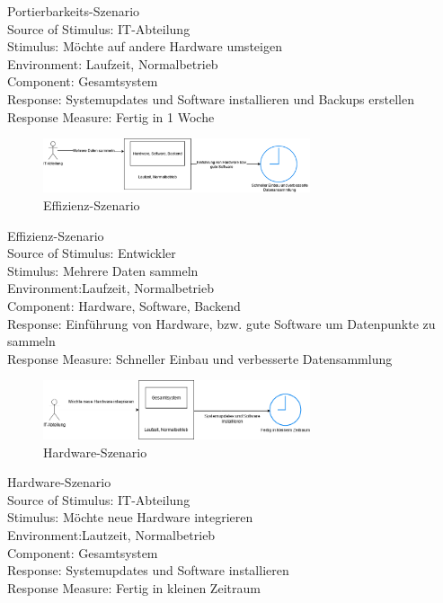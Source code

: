 Portierbarkeits-Szenario\\
Source of Stimulus: IT-Abteilung\\
Stimulus: Möchte auf andere Hardware umsteigen\\
Environment: Laufzeit, Normalbetrieb\\
Component: Gesamtsystem\\
Response: Systemupdates und Software installieren und Backups erstellen \\
Response Measure: Fertig in 1 Woche\\




\begin{figure}[tbh]
  \centering
  \includegraphics[width=0.7\textwidth]{Graphics/Effizienz.png}
  \caption{Effizienz-Szenario}
  \label{fig:Qualitaet5}
\end{figure}



Effizienz-Szenario\\
Source of Stimulus: Entwickler\\
Stimulus: Mehrere Daten sammeln\\
Environment:Laufzeit, Normalbetrieb\\
Component: Hardware, Software, Backend\\
Response: Einführung von Hardware, bzw. gute Software um Datenpunkte zu sammeln\\
Response Measure: Schneller Einbau und verbesserte Datensammlung\\




\begin{figure}[tbh]
  \centering
  \includegraphics[width=0.7\textwidth]{Graphics/Hardware.png}
  \caption{Hardware-Szenario}
  \label{fig:Qualitaet6}
\end{figure}


Hardware-Szenario\\
Source of Stimulus: IT-Abteilung\\
Stimulus: Möchte neue Hardware integrieren\\
Environment:Lautzeit, Normalbetrieb\\
Component: Gesamtsystem\\
Response: Systemupdates und Software installieren\\
Response Measure: Fertig in kleinen Zeitraum\\

